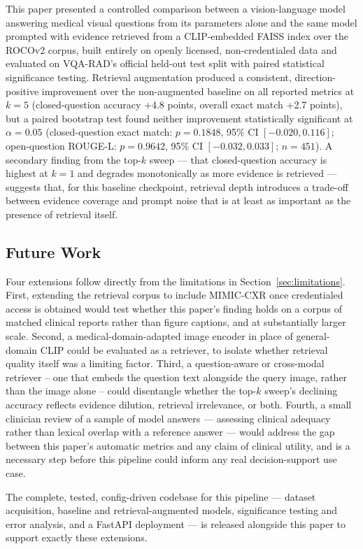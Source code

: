 This paper presented a controlled comparison between a vision-language
model answering medical visual questions from its parameters alone and the
same model prompted with evidence retrieved from a CLIP-embedded FAISS
index over the ROCOv2 corpus, built entirely on openly licensed,
non-credentialed data and evaluated on VQA-RAD's official held-out test
split with paired statistical significance testing. Retrieval augmentation
produced a consistent, direction-positive improvement over the
non-augmented baseline on all reported metrics at $k=5$ (closed-question
accuracy +4.8 points, overall exact match +2.7 points), but a paired
bootstrap test found neither improvement statistically significant at
$\alpha = 0.05$ (closed-question exact match: $p = 0.1848$, 95\% CI
$[-0.020, 0.116]$; open-question ROUGE-L: $p = 0.9642$, 95\% CI
$[-0.032, 0.033]$; $n = 451$). A secondary finding from the top-$k$ sweep
--- that closed-question accuracy is highest at $k=1$ and degrades
monotonically as more evidence is retrieved --- suggests that, for this
baseline checkpoint, retrieval depth introduces a trade-off between
evidence coverage and prompt noise that is at least as important as the
presence of retrieval itself.

\subsection{Future Work}

Four extensions follow directly from the limitations in
Section~\ref{sec:limitations}. First, extending the retrieval corpus to
include MIMIC-CXR once credentialed access is obtained would test whether
this paper's finding holds on a corpus of matched clinical reports rather
than figure captions, and at substantially larger scale. Second, a
medical-domain-adapted image encoder in place of general-domain CLIP could
be evaluated as a retriever, to isolate whether retrieval quality itself
was a limiting factor. Third, a question-aware or cross-modal retriever
-- one that embeds the question text alongside the query image, rather
than the image alone -- could disentangle whether the top-$k$ sweep's
declining accuracy reflects evidence dilution, retrieval irrelevance, or
both. Fourth, a small clinician review of a sample of model answers ---
assessing clinical adequacy rather than lexical overlap with a reference
answer --- would address the gap between this paper's automatic metrics
and any claim of clinical utility, and is a necessary step before this
pipeline could inform any real decision-support use case.

The complete, tested, config-driven codebase for this pipeline --- dataset
acquisition, baseline and retrieval-augmented models, significance testing
and error analysis, and a FastAPI deployment --- is released alongside this
paper to support exactly these extensions.
